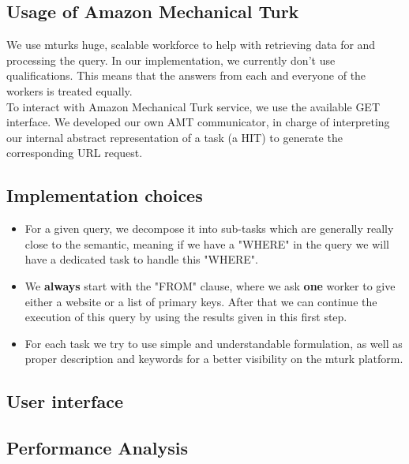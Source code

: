 \documentclass{article}
\begin{document}
\subsection{Usage of Amazon Mechanical Turk}
We use mturks huge, scalable workforce to help with retrieving data for and processing the query. In our implementation, we currently don't use qualifications. This means that the answers from each and everyone of the workers is treated equally.\\
To interact with Amazon Mechanical Turk service, we use the available GET interface. We developed our own AMT communicator, in charge of interpreting our internal abstract representation of a task (a HIT) to generate the corresponding URL request.
\subsection{Implementation choices}
\begin{itemize}
\item For a given query, we decompose it into sub-tasks which are generally really close to the semantic, meaning if we have a "WHERE" in the query we will have a dedicated task to handle this "WHERE".
\item We \textbf{always} start with the "FROM" clause, where we ask \textbf{one} worker to give either a website or a list of primary keys. After that we can continue the execution of this query by using the results given in this first step.
\item For each task we try to use simple and understandable formulation, as well as proper description and keywords for a better visibility on the mturk platform. 

\end{itemize}

\subsection{User interface}
\subsection{Performance Analysis}
\end{document}

